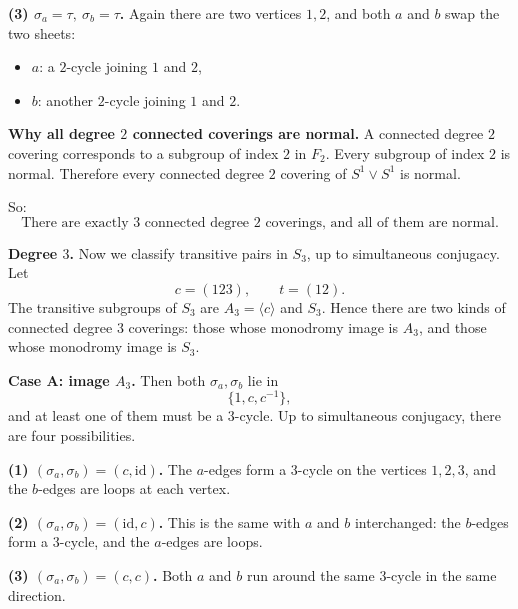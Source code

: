 \begin{solution}
\par

\textbf{(3) \(\sigma_a=\tau,\ \sigma_b=\tau\).}
Again there are two vertices \(1,2\), and both \(a\) and \(b\) swap the two sheets:
\begin{itemize}
	\item \(a\): a \(2\)-cycle joining \(1\) and \(2\),
	\item \(b\): another \(2\)-cycle joining \(1\) and \(2\).
\end{itemize}

\par

\textbf{Why all degree \(2\) connected coverings are normal.}
A connected degree \(2\) covering corresponds to a subgroup of index \(2\) in \(F_2\). Every subgroup of index \(2\) is normal. Therefore every connected degree \(2\) covering of \(S^1\vee S^1\) is normal.

So:
\[
\boxed{\text{There are exactly \(3\) connected degree \(2\) coverings, and all of them are normal.}}
\]

\par

\textbf{Degree \(3\).}
Now we classify transitive pairs in \(S_3\), up to simultaneous conjugacy. Let
\[
c=(123),\qquad t=(12).
\]
The transitive subgroups of \(S_3\) are \(A_3=\langle c\rangle\) and \(S_3\). Hence there are two kinds of connected degree \(3\) coverings: those whose monodromy image is \(A_3\), and those whose monodromy image is \(S_3\).

\par

\textbf{Case A: image \(A_3\).}
Then both \(\sigma_a,\sigma_b\) lie in
\[
\{1,c,c^{-1}\},
\]
and at least one of them must be a \(3\)-cycle. Up to simultaneous conjugacy, there are four possibilities.

\par

\textbf{(1) \((\sigma_a,\sigma_b)=(c,\mathrm{id})\).}
The \(a\)-edges form a \(3\)-cycle on the vertices \(1,2,3\), and the \(b\)-edges are loops at each vertex.

\par

\textbf{(2) \((\sigma_a,\sigma_b)=(\mathrm{id},c)\).}
This is the same with \(a\) and \(b\) interchanged: the \(b\)-edges form a \(3\)-cycle, and the \(a\)-edges are loops.

\par

\textbf{(3) \((\sigma_a,\sigma_b)=(c,c)\).}
Both \(a\) and \(b\) run around the same \(3\)-cycle in the same direction.


\end{solution}
